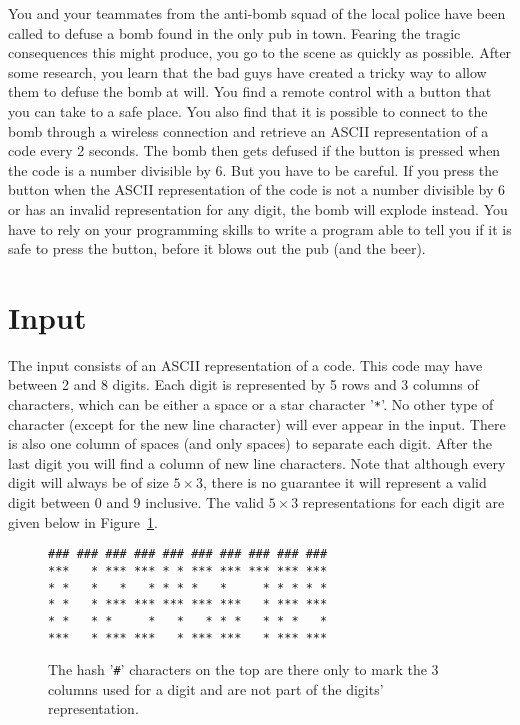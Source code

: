 

You and your teammates from the anti-bomb squad of the local police have been called to
defuse a bomb found in the only pub in town. Fearing the tragic consequences this might
produce, you go to the scene as quickly as possible. After some research, you learn that
the bad guys have created a tricky way to allow them to defuse the bomb at will. You
find a remote control with a button that you can take to a safe place. You also find that
it is possible to connect to the bomb through a wireless connection and retrieve an ASCII
representation of a code every 2 seconds. The bomb then gets defused if the button is
pressed when the code is a number divisible by 6. But you have to be careful. If you press
the button when the ASCII representation of the code is not a number divisible by 6 or has
an invalid representation for any digit, the bomb will explode instead. You have to rely
on your programming skills to write a program able to tell you if it is safe to press the
button, before it blows out the pub (and the beer).

\section*{Input}

The input consists of an ASCII representation of a code. This code may have between 2 and 8
digits. Each digit is represented by 5 rows and 3 columns of characters, which can be either
a space or a star character '\texttt{*}'. No other type of character (except for the new line
character) will ever appear in the input. There is also one column of spaces (and only
spaces) to separate each digit. After the last digit you will find a column of new line
characters. Note that although every digit will always be of size $5\times 3$,
there is no guarantee it will represent a valid digit between 0 and 9 inclusive. The valid
$5\times 3$ representations for each digit are given below in Figure~\ref{fig:digits}.

\begin{figure}[h]
  \centering
  \begin{minipage}{0.5\textwidth}
\begin{verbatim}
### ### ### ### ### ### ### ### ### ###
***   * *** *** * * *** *** *** *** ***
* *   *   *   * * * *   *     * * * * *
* *   * *** *** *** *** ***   * *** ***
* *   * *     *   *   * * *   * * *   *
***   * *** ***   * *** ***   * *** ***
\end{verbatim}
  \end{minipage}
  \caption{The hash '{\tt \#}' characters on the top are there only to mark the 3 columns used for
    a digit and are not part of the digits' representation.}
  \label{fig:digits}
\end{figure}

